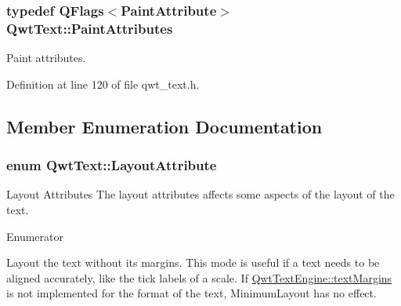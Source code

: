 \hypertarget{class_qwt_text_a0d239ca5c8e0cd3c748325ad453bb13f}{
\subsubsection[{Paint\-Attributes}]{\setlength{\rightskip}{0pt plus 5cm}typedef Q\-Flags$<${\bf Paint\-Attribute}$>$ {\bf Qwt\-Text\-::\-Paint\-Attributes}}}\label{class_qwt_text_a0d239ca5c8e0cd3c748325ad453bb13f}


Paint attributes. 



Definition at line 120 of file qwt\-\_\-text.\-h.



\subsection{Member Enumeration Documentation}
\hypertarget{class_qwt_text_a0953aabc098f410dba89bbada47f2e5a}{
\subsubsection[{Layout\-Attribute}]{\setlength{\rightskip}{0pt plus 5cm}enum {\bf Qwt\-Text\-::\-Layout\-Attribute}}}\label{class_qwt_text_a0953aabc098f410dba89bbada47f2e5a}


Layout Attributes The layout attributes affects some aspects of the layout of the text. 

\begin{Desc}
\item[Enumerator]\par
\begin{description}
\item[{\em 
\hypertarget{class_qwt_text_a0953aabc098f410dba89bbada47f2e5aa35990c4c74747580e9357d490ebce42f}{Minimum\-Layout}\label{class_qwt_text_a0953aabc098f410dba89bbada47f2e5aa35990c4c74747580e9357d490ebce42f}
}]Layout the text without its margins. This mode is useful if a text needs to be aligned accurately, like the tick labels of a scale. If \hyperlink{class_qwt_text_engine_a83c8d3dc590b9914e9216c01e78e0838}{Qwt\-Text\-Engine\-::text\-Margins} is not implemented for the format of the text, Minimum\-Layout has no effect. \end{description}
\end{Desc}


